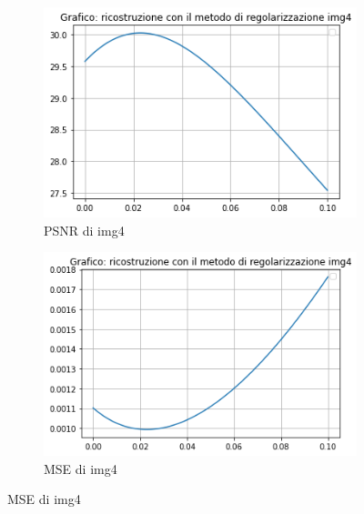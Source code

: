 \begin{figure}[H]
    \begin{subfigure}{0.5\textwidth}
        \centering
        \includegraphics[width=\textwidth]{output/PSNR/outputPSNR-img4.png}
        \caption{PSNR di img4}
        \label{fig:img4PSNR}
    \end{subfigure}\hfill
    \begin{subfigure}{0.5\textwidth}
        \centering
        \includegraphics[width=\textwidth]{output/MSE/outputMSE-img4.png}
        \caption{MSE di img4}
        \label{fig:img4MSE}
    \end{subfigure}


\end{figure}
